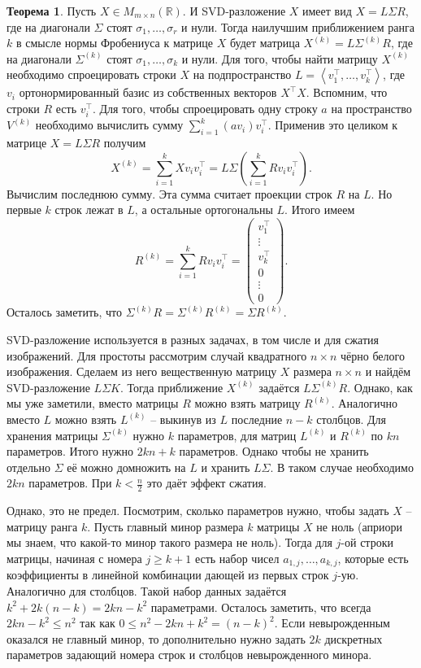 \documentclass[10pt,a4paper,oneside]{book}
\theoremstyle{definition}
\newtheorem{thm}{Теорема}
\newcommand{\mb}[1]{\mathbb{#1}}
\def\lan{\left\langle }
\def\ran{\right\rangle}
\def\thrm{\begin{thm}}
\def\ethrm{\end{thm}}
\def\pmat{\begin{pmatrix}}
\def\epmat{\end{pmatrix}}
\begin{document}
\thrm Пусть $X\in M_{m\times n}(\mb R)$. И SVD-разложение $X$ имеет вид $X=L\Sigma R$, где на диагонали $\Sigma$ стоят $\sigma_1,\dots,\sigma_r$ и нули. Тогда наилучшим приближением ранга $k$ в смысле нормы Фробениуса к матрице $X$ будет матрица $X^{(k)}=L\Sigma^{(k)}R$, где на диагонали $\Sigma^{(k)}$ стоят $\sigma_1,\dots,\sigma_{k}$ и нули.
\proof Для того, чтобы найти матрицу $X^{(k)}$ необходимо спроецировать строки $X$ на подпространство $L=\lan v_1^{\top},\dots,v_k^{\top}\ran$, где $v_i$ ортонормированный базис из собственных векторов $X^{\top}X$.  Вспомним, что строки $R$ есть $v_i^{\top}$. Для того, чтобы спроецировать одну строку $a$ на пространство $V^{(k)}$ необходимо вычислить сумму $\sum_{i=1}^k (av_i)v_i^{\top}$. Применив это целиком к матрице $X=L\Sigma R$ получим 
$$X^{(k)}=\sum_{i=1}^k Xv_iv_i^{\top}=L\Sigma \left(\sum_{i=1}^k Rv_iv_i^{\top}\right).$$
Вычислим последнюю сумму. Эта сумма считает проекции строк $R$ на $L$. Но первые $k$ строк лежат в $L$, а остальные ортогональны $L$. Итого имеем
$$R^{(k)}=\sum_{i=1}^k Rv_iv_i^{\top} = \pmat v_1^{\top} \\ \vdots \\ v_k^{\top} \\ 0 \\ \vdots \\ 0 \epmat.$$
Осталось заметить, что $\Sigma^{(k)} R= \Sigma^{(k)}R^{(k)}=\Sigma R^{(k)}$.
\endproof
\ethrm 

SVD-разложение используется в разных задачах, в том числе и для сжатия изображений.  Для простоты рассмотрим случай квадратного $n \times n$ чёрно белого изображения. Сделаем из него вещественную матрицу $X$ размера $n \times n$ и найдём SVD-разложение $L \Sigma K$. Тогда приближение $X^{(k)}$ задаётся $L\Sigma^{(k)}R$. Однако, как мы уже заметили, вместо матрицы $R$ можно взять матрицу $R^{(k)}$. Аналогично вместо $L$ можно взять $L^{(k)}$ -- выкинув из $L$ последние $n-k$ столбцов. Для хранения матрицы $\Sigma^{(k)}$ нужно $k$ параметров, для матриц $L^{(k)}$ и $R^{(k)}$ по $kn$ параметров. Итого нужно $2kn+k$ параметров. Однако чтобы не хранить отдельно $\Sigma$ её можно домножить на $L$ и хранить $L\Sigma$. В таком случае необходимо $2kn$ параметров. При $k<\frac{n}{2}$ это даёт эффект сжатия. 

Однако, это не предел. Посмотрим, сколько параметров нужно, чтобы задать $X$ -- матрицу ранга $k$. Пусть главный минор размера $k$ матрицы $X$ не ноль (априори мы знаем, что какой-то минор такого размера не ноль). Тогда для $j$-ой строки матрицы, начиная с номера $j \geq k+1$ есть набор чисел $a_{1,j},\dots,a_{k,j}$, которые есть коэффициенты в линейной комбинации дающей из первых строк $j$-ую. Аналогично для столбцов. Такой набор данных задаётся $k^2+ 2k(n-k)=2kn-k^2$ параметрами. Осталось заметить, что всегда $2kn - k^2\leq n^2$ так как $0\leq n^2-2kn+k^2=(n-k)^2$. Если невырожденным оказался не главный минор, то дополнительно нужно задать $2k$ дискретных параметров задающий номера строк и столбцов невырожденного минора.
\end{document}
